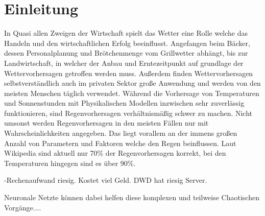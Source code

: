 \section{Einleitung}
In Quasi allen Zweigen der Wirtschaft spielt das Wetter eine Rolle welche das Handeln und den wirtschaftlichen Erfolg beeinflusst.
Angefangen beim Bäcker, dessen Personalplanung und Brötchenmenge vom Grillwetter abhängt, 
bis zur Landwirtschaft, in welcher der Anbau und Erntezeitpunkt auf grundlage der Wettervorhersagen getroffen werden muss. 
Außerdem finden Wettervorhersagen selbstverständlich auch im privaten Sektor große Anwendung und werden von den meisten Menschen täglich verwendet. 
Während die Vorhersage von Temperaturen und Sonnenstunden mit Physikalischen Modellen inzwischen sehr zuverlässig funktionieren, 
sind Regenvorhersagen verhältnismäßig schwer zu machen. Nicht umsonst werden Regenvorhersagen in den meisten Fällen nur mit Wahrscheinlichkeiten angegeben. 
Das liegt vorallem an der immens großen Anzahl von Parametern und Faktoren welche den Regen beinflussen. 
Laut Wikipedia sind aktuell nur 70\% der Regenvorhersagen korrekt, bei den Temperaturen hingegen sind es über 90\%. 

-Rechenaufwand riesig. Kostet viel Geld. DWD hat riesig Server.

\noindent Neuronale Netzte können dabei helfen diese komplexen und teilweise Chaotischen Vorgänge....

